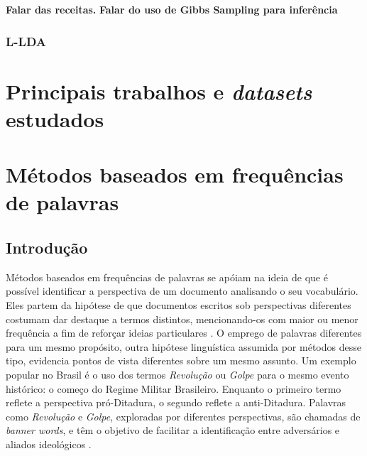 

 \textbf{Falar das receitas.}
\textbf{Falar do uso de Gibbs Sampling para inferência}


\subsection{L-LDA}

\chapter{Principais trabalhos e \emph{datasets} estudados}

\chapter{Métodos baseados em frequências de palavras}

\section{Introdução}

Métodos baseados em frequências de palavras se apóiam na ideia de que é possível identificar a perspectiva de um documento analisando o seu vocabulário. Eles partem da hipótese de que documentos escritos sob perspectivas diferentes costumam dar destaque a termos distintos, mencionando-os com maior ou menor frequência a fim de reforçar ideias particulares \cite{teubert2001}. O emprego de palavras diferentes para um mesmo propósito, outra hipótese linguística assumida por métodos desse tipo, evidencia pontos de vista diferentes sobre um mesmo assunto. Um exemplo popular no Brasil é o uso dos termos \emph{Revolução} ou \emph{Golpe} para o mesmo evento histórico: o começo do Regime Militar Brasileiro. Enquanto o primeiro termo reflete a perspectiva pró-Ditadura, o segundo reflete a anti-Ditadura. Palavras como \emph{Revolução} e \emph{Golpe}, exploradas por diferentes perspectivas, são chamadas de \emph{banner words}, e têm o objetivo de facilitar a identificação entre adversários e aliados ideológicos \cite{teubert2001}.




